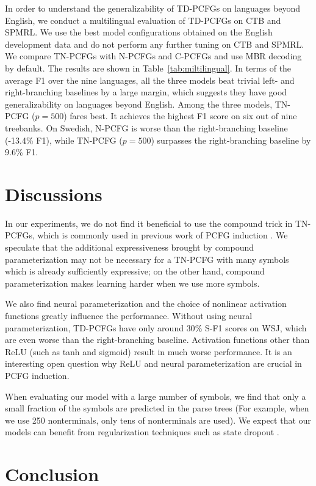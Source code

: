 \documentclass[11pt]{article}
\begin{document}
In order to understand the generalizability of TD-PCFGs on languages beyond English,
we conduct a multilingual evaluation of TD-PCFGs on CTB and SPMRL.
We use the best model configurations obtained on the English development data and do not perform any further tuning on CTB and SPMRL.
We compare TN-PCFGs with N-PCFGs and C-PCFGs and
use MBR decoding by default. The results are shown in Table~\ref{tab:miltilingual}.
In terms of the average F1 over the nine languages,
all the three models beat trivial left- and right-branching baselines by a large margin,
which suggests they have good generalizability on languages beyond English.
Among the three models, TN-PCFG ($p=500$) fares best.
It achieves the highest F1 score on six out of nine treebanks.
On Swedish, N-PCFG is worse than the right-branching baseline (-13.4\% F1),
while TN-PCFG ($p=500$) surpasses the right-branching baseline by 9.6\% F1.


\section{Discussions}
In our experiments, we do not find it beneficial to use the compound trick \cite{kim-etal-2019-compound} in TN-PCFGs, which is commonly used in previous work of PCFG induction \cite{kim-etal-2019-compound, zhao-titov-2020-visually, zhu2020return}. We speculate that the additional expressiveness brought by compound parameterization may not be necessary for a TN-PCFG with many symbols which is already sufficiently expressive; on the other hand, compound parameterization makes learning harder when we use more symbols. 

We also find neural parameterization and the choice of nonlinear activation functions greatly influence the performance. Without using neural parameterization, TD-PCFGs have only around $30\%$ S-F1 scores on WSJ, which are even worse than the right-branching baseline. Activation functions other than ReLU (such as tanh and sigmoid) result in much worse performance. It is an interesting open question why ReLU and neural parameterization are crucial in PCFG induction.   

When evaluating our model with a large number of symbols, we find that only a small fraction of the symbols are predicted in the parse trees (For example, when we use 250 nonterminals, only tens of nonterminals are used). We expect that our models can benefit from regularization techniques such as state dropout \cite{chiu-rush-2020-scaling}. 

\section{Conclusion}
\end{document}
